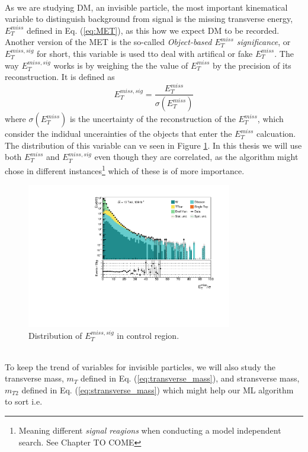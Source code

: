 \documentclass[14pt, a4paper]{book}
\begin{document}
\\As we are studying DM, an invisible particle, the most important kinematical variable to distinguish background from signal is the missing transverse energy, $E_T^{miss}$ defined in Eq. (\ref{eq:MET}), as this how we expect DM to be recorded.
Another version of the MET is the so-called \textit{Object-based $E_T^{miss}$ significance}, or $E_T^{miss,sig}$ for short, this variable is used tto deal with artifical or fake $E_T^{miss}$. The way $E_T^{miss,sig}$ works is by 
weighing the the value of $E_T^{miss}$ by the precision of its reconstruction. It is defined as
\begin{equation}\label{eq:METsig}
    E_T^{miss,sig} = \frac{E_T^{miss}}{\sigma(E_T^{miss})}
\end{equation}
where $\sigma(E_T^{miss})$ is the uncertainty of the reconstruction of the $E_T^{miss}$, which consider the indidual uncerainties of the objects that enter the $E_T^{miss}$ calcuation. The distribution of this variable can ve seen in Figure \ref{fig:met_sig_dist}. 
In this thesis we will use both $E_T^{miss}$ and $E_T^{miss,sig}$ even though they are correlated, as the algorithm might chose in different instances\footnote{Meaning different \textit{signal reagions} when conducting a model independent search. See Chapter TO COME} 
which of these is of more importance.
\begin{figure}[!ht]
    \centering
        \includegraphics[width=0.8\textwidth]{met_sig.pdf}
    \caption{Distribution of $E_{T}^{miss,sig}$ in control region.}\label{fig:met_sig_dist}
\end{figure}
\\To keep the trend of variables for invisible particles, we will also study the transverse mass, $m_T$ defined in Eq. (\ref{eq:transverse_mass}), and stransverse mass, $m_{T2}$ defined in Eq. (\ref{eq:stransverse_mass}) which might help our ML algorithm to sort i.e. 
\end{document}
